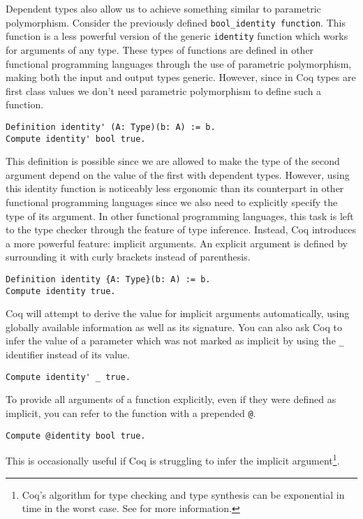 Dependent types also allow us to achieve something similar to parametric polymorphism. Consider the
previously defined \texttt{bool_identity function}. This function is a less powerful version
of the generic \texttt{identity} function which works for arguments of any type. These types
of functions are defined in other functional programming languages through the use of parametric
polymorphism, making both the input and output types generic. However, since in Coq types are first
class values we don't need parametric polymorphism to define such a function.
\begin{verbatim}
Definition identity' (A: Type)(b: A) := b. 
Compute identity' bool true.
\end{verbatim}
This definition is possible since we are allowed to make the type of the second argument depend on the
value of the first with dependent types. However, using this identity function is noticeably less
ergonomic than its counterpart in other functional programming languages since we also need to 
explicitly specify the type of its argument. In other functional programming languages, this task is
left to the type checker through the feature of type inference. Instead, Coq introduces a more powerful
feature: implicit arguments. An explicit argument is defined by surrounding it with curly brackets instead of parenthesis.
\begin{verbatim}
Definition identity {A: Type}(b: A) := b. 
Compute identity true.
\end{verbatim}
Coq will attempt to derive the value for implicit arguments automatically, using globally available
information as well as its signature. You can also ask Coq to infer the value of a parameter which was
not marked as implicit by using the \texttt{_} identifier instead of its value.
\begin{verbatim}
Compute identity' _ true.
\end{verbatim}
To provide all arguments of a function explicitly, even if they were defined as implicit, you can 
refer to the function with a prepended \texttt{@}.
\begin{verbatim}
Compute @identity bool true.
\end{verbatim}
\noindent This is occasionally useful if Coq is struggling to infer the implicit argument\footnote{Coq's algorithm for type checking and type synthesis can be exponential in time in the worst case. See \cite{CoqTypeCheckingExponential} for more information.}.


